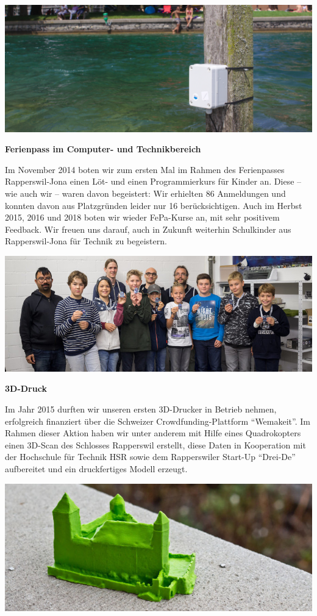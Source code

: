 \documentclass[10pt,a4paper,parskip,fleqn]{scrartcl}
\begin{document}
\includegraphics[width=\textwidth]{img/gfroerli.jpg}

\textbf{Ferienpass im Computer- und Technikbereich}

Im November 2014 boten wir zum ersten Mal im Rahmen des Ferienpasses
Rapperswil-Jona einen Löt- und einen Programmierkurs für Kinder an. Diese -- wie
auch wir -- waren davon begeistert: Wir erhielten 86 Anmeldungen und
konnten davon aus Platzgründen leider nur 16 berücksichtigen. Auch im Herbst
2015, 2016 und 2018 boten wir wieder FePa-Kurse an, mit sehr positivem
Feedback. Wir freuen uns darauf, auch in Zukunft weiterhin Schulkinder aus
Rapperswil-Jona für Technik zu begeistern.

\includegraphics[width=\textwidth]{img/fepa3.jpg}

\textbf{3D-Druck}

Im Jahr 2015 durften wir unseren ersten 3D-Drucker in Betrieb nehmen,
erfolgreich finanziert über die Schweizer Crowdfunding-Plattform ``Wemakeit''.
Im Rahmen dieser Aktion haben wir unter anderem mit Hilfe eines Quadrokopters
einen 3D-Scan des Schlosses Rapperswil erstellt, diese Daten in Kooperation mit
der Hochschule für Technik HSR sowie dem Rapperswiler Start-Up ``Drei-De''
aufbereitet und ein druckfertiges Modell erzeugt.

\includegraphics[width=\textwidth]{img/schloss-slim.jpg}
\end{document}
